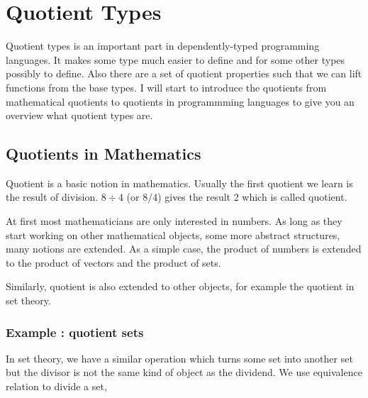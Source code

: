\chapter{Quotient Types}
\label{qt}


Quotient types is an important part in dependently-typed programming
languages. It makes some type much easier to define and for some other
types possibly to define. Also there are
a set of quotient properties such that we can lift functions from the
base types. I will start to introduce the quotients from mathematical
quotients to quotients in programmming languages to give you an
overview what quotient types are.


\section{Quotients in Mathematics}




Quotient is a basic notion in mathematics. Usually the first
quotient we learn is the result of division. $8 \div 4$ (or $8 / 4$)
gives the result 2 which is called quotient.

At first most mathematicians are only interested in numbers. As long
as they start working on other mathematical objects, some more
abstract structures, many notions are extended. As a simple case, the
product of numbers is extended to the product of vectors and the
product of sets. 

Similarly, quotient is also extended to other objects, for example the
quotient in set theory.

\subsection{Example : quotient sets}
In set theory, we have a similar operation which turns some set
into another set but the divisor is not the same kind of object as the
dividend. We use equivalence relation to divide a set,

